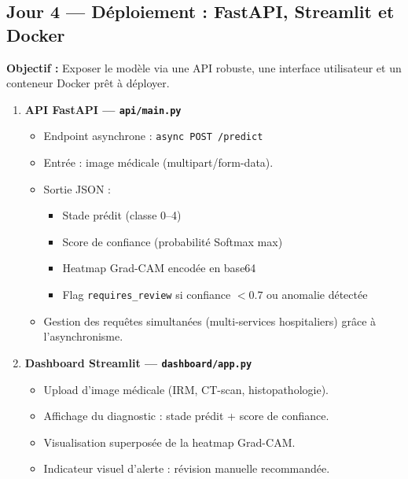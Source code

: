 \documentclass[12pt,a4paper]{article}
\begin{document}
\newpage
\subsection{Jour 4 — Déploiement : FastAPI, Streamlit et Docker}

\begin{daybox}
\textbf{Objectif :} Exposer le modèle via une API robuste, une interface utilisateur et un conteneur Docker prêt à déployer.
\end{daybox}

\vspace{0.4cm}

\begin{enumerate}[label=\textbf{Étape \arabic*.}, leftmargin=2.5cm, itemsep=0.4cm, start=12]

  \item \textbf{API FastAPI — \texttt{api/main.py}}
  \begin{itemize}
    \item Endpoint asynchrone : \texttt{async POST /predict}
    \item Entrée : image médicale (multipart/form-data).
    \item Sortie JSON :
    \begin{itemize}
      \item Stade prédit (classe 0–4)
      \item Score de confiance (probabilité Softmax max)
      \item Heatmap Grad-CAM encodée en base64
      \item Flag \texttt{requires\_review} si confiance $< 0.7$ ou anomalie détectée
    \end{itemize}
    \item Gestion des requêtes simultanées (multi-services hospitaliers) grâce à l'asynchronisme.
  \end{itemize}

  \item \textbf{Dashboard Streamlit — \texttt{dashboard/app.py}}
  \begin{itemize}
    \item Upload d'image médicale (IRM, CT-scan, histopathologie).
    \item Affichage du diagnostic : stade prédit + score de confiance.
    \item Visualisation superposée de la heatmap Grad-CAM.
    \item Indicateur visuel d'alerte : révision manuelle recommandée.
  \end{itemize}


\end{enumerate}
\end{document}
